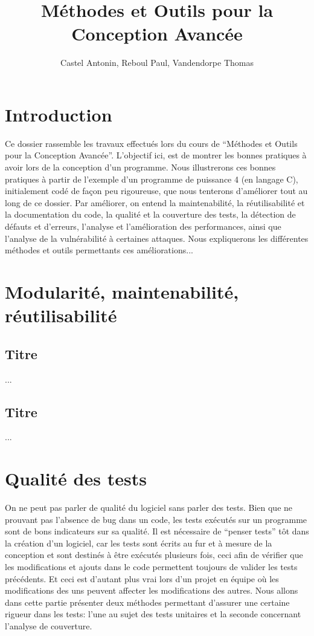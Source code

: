 \documentclass{report}
\title{Méthodes et Outils pour la Conception Avancée}
\author{Castel Antonin, Reboul Paul, Vandendorpe Thomas}
\begin{document}
\maketitle{}
\tableofcontents

\chapter{Introduction}

Ce dossier rassemble les travaux effectués lors du cours de ``Méthodes et Outils pour la Conception Avancée''. L'objectif ici, est de montrer les bonnes pratiques à avoir lors de la conception d'un programme. Nous illustrerons ces bonnes pratiques à partir de l'exemple d'un programme de puissance 4 (en langage C), initialement codé de façon peu rigoureuse, que nous tenterons d'améliorer tout au long de ce dossier. Par améliorer, on entend  la maintenabilité, la réutilisabilité et la documentation du code, la qualité et la couverture des tests, la détection de défauts et d'erreurs, l'analyse et l'amélioration des performances, ainsi que l'analyse de la vulnérabilité à certaines attaques. Nous expliquerons les différentes méthodes et outils permettants ces améliorations...

\chapter{Modularité, maintenabilité, réutilisabilité}
\section{Titre}
...
\section{Titre}
...

\chapter{Qualité des tests}
On ne peut pas parler de qualité du logiciel sans parler des tests. Bien que ne prouvant pas l'absence de bug dans un code, les tests exécutés sur un programme sont de bons indicateurs sur sa qualité. Il est nécessaire de ``penser tests'' tôt dans la création d'un logiciel, car les tests sont écrits au fur et à mesure de la conception et sont destinés à être exécutés plusieurs fois, ceci afin de vérifier que les modifications et ajouts dans le code permettent toujours de valider les tests précédents. Et ceci est d'autant plus vrai lors d'un projet en équipe où les modifications des uns peuvent affecter les modifications des autres. Nous allons dans cette partie présenter deux méthodes permettant d'assurer une certaine rigueur dans les tests: l'une au sujet des tests unitaires et la seconde concernant l'analyse de couverture.
\end{document}
